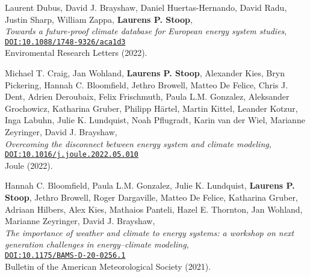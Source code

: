 \begin{etaremune}{\small

\item Laurent Dubus\ts{\Letter}, David J. Brayshaw, Daniel Huertas-Hernando, David Radu, Justin Sharp, William Zappa, \textbf{Laurens P. Stoop}, \\
\textit{Towards a future-proof climate database for European energy system studies}, \\
\texttt{\href{http://doi.org/10.1088/1748-9326/aca1d3}{DOI:10.1088/1748-9326/aca1d3}} \\
Enviromental Research Letters (2022).

\item Michael T. Craig\ts{\Writinghand}, Jan Wohland\ts{\Writinghand, \Letter}, \textbf{Laurens P. Stoop}\ts{\Writinghand}, Alexander Kies, Bryn Pickering, Hannah C. Bloomfield, Jethro Browell, Matteo De Felice, Chris J. Dent, Adrien Deroubaix, Felix Frischmuth, Paula L.M. Gonzalez, Aleksander Grochowicz, Katharina Gruber, Philipp Härtel, Martin Kittel, Leander Kotzur, Inga Labuhn, Julie K. Lundquist, Noah Pflugradt, Karin van der Wiel, Marianne Zeyringer, David J. Brayshaw, \\
\textit{Overcoming the disconnect between energy system and climate modeling}, \\
\texttt{\href{https://doi.org/10.1016/j.joule.2022.05.010}{DOI:10.1016/j.joule.2022.05.010}} \\
Joule (2022).

\item Hannah C. Bloomfield\ts{\Letter}, Paula L.M. Gonzalez, Julie K. Lundquist, \textbf{Laurens P. Stoop}, Jethro Browell, Roger Dargaville, Matteo De Felice, Katharina Gruber, Adriaan Hilbers, Alex Kies, Mathaios Panteli, Hazel E. Thornton, Jan Wohland, Marianne Zeyringer, David J. Brayshaw, \\
\textit{The importance of weather and climate to energy systems: a workshop on next generation challenges in energy–climate modeling}, \\
\texttt{\href{https://doi.org/10.1175/BAMS-D-20-0256.1}{DOI:10.1175/BAMS-D-20-0256.1}} \\
Bulletin of the American Meteorological Society (2021).

}\end{etaremune}

